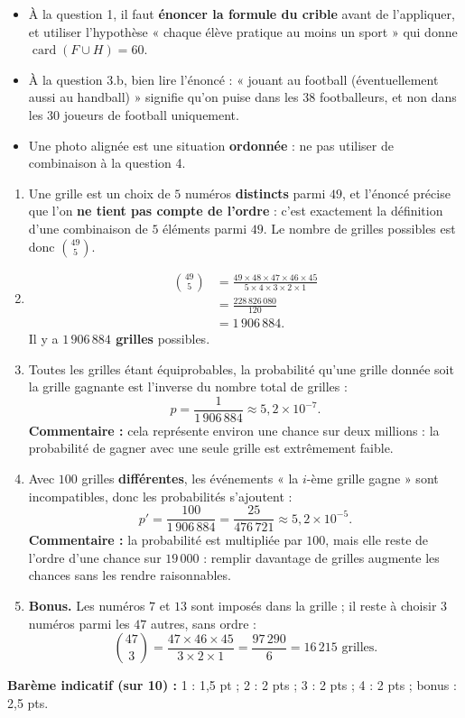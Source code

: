 \documentclass[11pt]{article}
\newcommand{\cle}[1]{{\popxbold\color{popdark}#1}}
\begin{document}
\begin{attention}
\begin{itemize}
\item À la question 1, il faut \textbf{énoncer la formule du crible} avant de l'appliquer, et utiliser l'hypothèse « chaque élève pratique au moins un sport » qui donne $\operatorname{card}(F\cup H)=60$.
\item À la question 3.b, bien lire l'énoncé : « jouant au football (éventuellement aussi au handball) » signifie qu'on puise dans les $38$ footballeurs, et non dans les $30$ joueurs de football uniquement.
\item Une photo alignée est une situation \textbf{ordonnée} : ne pas utiliser de combinaison à la question 4.
\end{itemize}
\end{attention}

\begin{corrige}
\begin{enumerate}
\item Une grille est un choix de $5$ numéros \textbf{distincts} parmi $49$, et l'énoncé précise que l'on \textbf{ne tient pas compte de l'ordre} : c'est exactement la définition d'une \cle{combinaison} de $5$ éléments parmi $49$. Le nombre de grilles possibles est donc $\binom{49}{5}$.
\item
\begin{align*}
\binom{49}{5}&=\frac{49\times48\times47\times46\times45}{5\times4\times3\times2\times1}\\
&=\frac{228\,826\,080}{120}\\
&=1\,906\,884.
\end{align*}
Il y a \textbf{$1\,906\,884$ grilles} possibles.
\item Toutes les grilles étant équiprobables, la probabilité qu'une grille donnée soit la grille gagnante est l'inverse du nombre total de grilles :
\[ p=\frac{1}{1\,906\,884}\approx 5{,}2\times10^{-7}. \]
\textbf{Commentaire :} cela représente environ une chance sur deux millions : la probabilité de gagner avec une seule grille est extrêmement faible.
\item Avec $100$ grilles \textbf{différentes}, les événements « la $i$-ème grille gagne » sont incompatibles, donc les probabilités s'ajoutent :
\[ p'=\frac{100}{1\,906\,884}=\frac{25}{476\,721}\approx 5{,}2\times10^{-5}. \]
\textbf{Commentaire :} la probabilité est multipliée par $100$, mais elle reste de l'ordre d'une chance sur $19\,000$ : remplir davantage de grilles augmente les chances sans les rendre raisonnables.
\item \textbf{Bonus.} Les numéros $7$ et $13$ sont imposés dans la grille ; il reste à choisir $3$ numéros parmi les $47$ autres, sans ordre :
\[ \binom{47}{3}=\frac{47\times46\times45}{3\times2\times1}=\frac{97\,290}{6}=16\,215 \text{ grilles.} \]
\end{enumerate}
\textbf{Barème indicatif (sur 10) :} 1 : 1,5 pt ; 2 : 2 pts ; 3 : 2 pts ; 4 : 2 pts ; bonus : 2,5 pts.
\end{corrige}
\end{document}
